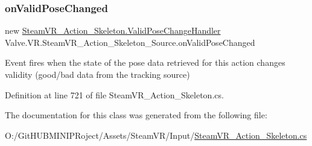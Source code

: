 \subsubsection{\texorpdfstring{onValidPoseChanged}{onValidPoseChanged}}
{\footnotesize\ttfamily new \mbox{\hyperlink{class_valve_1_1_v_r_1_1_steam_v_r___action___skeleton_af5ad5e815b7f555aa33ee8b74385e89e}{Steam\+V\+R\+\_\+\+Action\+\_\+\+Skeleton.\+Valid\+Pose\+Change\+Handler}} Valve.\+V\+R.\+Steam\+V\+R\+\_\+\+Action\+\_\+\+Skeleton\+\_\+\+Source.\+on\+Valid\+Pose\+Changed}



Event fires when the state of the pose data retrieved for this action changes validity (good/bad data from the tracking source) 



Definition at line 721 of file Steam\+V\+R\+\_\+\+Action\+\_\+\+Skeleton.\+cs.



The documentation for this class was generated from the following file\+:\begin{DoxyCompactItemize}
\item 
O\+:/\+Git\+H\+U\+B\+M\+I\+N\+I\+P\+Roject/\+Assets/\+Steam\+V\+R/\+Input/\mbox{\hyperlink{_steam_v_r___action___skeleton_8cs}{Steam\+V\+R\+\_\+\+Action\+\_\+\+Skeleton.\+cs}}\end{DoxyCompactItemize}

